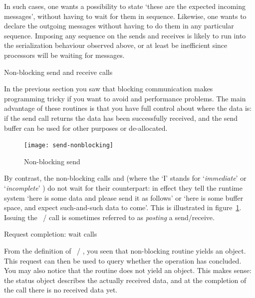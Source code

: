 In such cases, one wants a possibility to state `these are the expected incoming
messages', without having to wait for them in sequence. Likewise, one wants to declare
the outgoing messages without having to do them in any particular sequence.
Imposing any sequence on the sends and receives is likely to run into the serialization
behaviour observed above, or at least be inefficient since processors will be
waiting for messages.

 {Non-blocking send and receive calls}
\label{sec:nonblocking}

In the previous section you saw that blocking communication makes
programming tricky if you want to avoid  and performance
problems. The main advantage of these routines is that you have full
control about where the data is: if the send call returns
the data has been successfully received, and the send buffer can be used for
other purposes or de-allocated.  

\begin{figure}[ht]
  \texttt{[image: send-nonblocking]}
  \caption{Non-blocking send}
  \label{fig:send-nonblocking}
\end{figure}

By contrast, the non-blocking calls
 and 
(where the `I' stands for
`\emph{immediate}'
or
`\emph{incomplete}'
)
do not wait for their counterpart: in effect
they tell the runtime system `here is some data and please send it as
follows' or `here is some buffer space, and expect such-and-such data
to come'.  This is illustrated in figure~\ref{fig:send-nonblocking}.
%
%
Issuing the ~/ 
call is sometimes referred to as
\emph{posting}
a send/receive.

 {Request completion: wait calls}

From the definition of ~/
, you seen that non-blocking routine yields
an  object. This request can then be used to
query whether the operation has concluded. You may also notice that
the  routine does not yield an
 object.  This makes sense: the status object
describes the actually received data, and at the completion of the
 call there is no received data yet.

